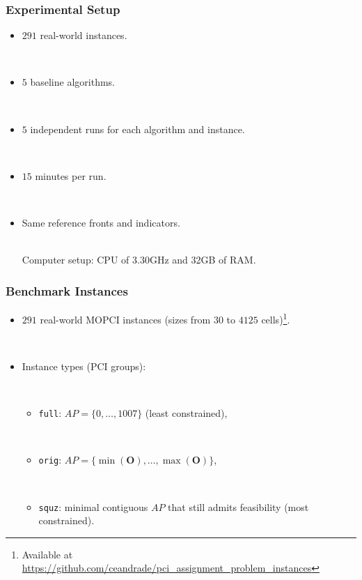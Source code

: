 \documentclass[
	11pt, %
	aspectratio=169, %
]{beamer}
\begin{document}
\begin{frame}
\frametitle{Experimental Setup}

\begin{itemize}
\item $291$ real-world instances.

~\\

\item $5$ baseline algorithms.

~\\

\item $5$ independent runs for each algorithm and instance.

~\\

\item $15$ minutes per run.

~\\

\item Same reference fronts and indicators.

~\\

Computer setup: CPU of 3.30GHz and 32GB of RAM.

\end{itemize}

\end{frame}

\begin{frame}
\frametitle{Benchmark Instances}

\begin{itemize}
\item $291$ real-world MOPCI instances (sizes from $30$ to $4125$ cells)\footnote{Available at \href{https://github.com/ceandrade/pci\_assignment\_problem\_instances}{https://github.com/ceandrade/pci\_assignment\_problem\_instances}}.

~\\

\item Instance types (PCI groups):

~\\

\begin{itemize}
\item \texttt{full}: $AP = \{0, \dots, 1007\}$ (least constrained),

~\\

\item \texttt{orig}: $AP = \{\min(\mathbf{O}), \dots, \max(\mathbf{O})\}$,

~\\

\item \texttt{squz}: minimal contiguous $AP$ that still admits feasibility (most constrained).
\end{itemize}
\end{itemize}
\end{frame}
\end{document}
